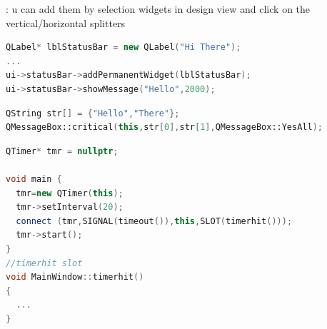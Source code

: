 \begin{note}[QSplitter]: u can add them by selection widgets in design view and click on the vertical/horizontal splitters
\end{note}

\begin{note}[QStatusBar]
\begin{lstlisting}[language = {c++}]
QLabel* lblStatusBar = new QLabel("Hi There");
...
ui->statusBar->addPermanentWidget(lblStatusBar);
ui->statusBar->showMessage("Hello",2000);
\end{lstlisting}
\end{note}

\begin{note}[QMessageBox]
\begin{lstlisting}[language = {c++}]
QString str[] = {"Hello","There"};
QMessageBox::critical(this,str[0],str[1],QMessageBox::YesAll);
\end{lstlisting}
\end{note}

\begin{note}[QTimer]
\begin{lstlisting}[language = {c++}]
QTimer* tmr = nullptr;

void main {
  tmr=new QTimer(this);
  tmr->setInterval(20);
  connect (tmr,SIGNAL(timeout()),this,SLOT(timerhit()));
  tmr->start();
}
//timerhit slot
void MainWindow::timerhit()
{
  ...
}
\end{lstlisting}
\end{note}

